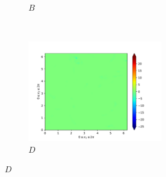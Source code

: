 \begin{figure}[H]
\begin{subfigure}{0.45\textwidth}
        \caption{$B$}
    \end{subfigure}
    ~
    \begin{subfigure}{0.45\textwidth}
        \includegraphics[height=1.75in]{media/run-cds-65/D-ke-1318}
        \caption{$D$}
    \end{subfigure}
\end{figure}

\newpage

